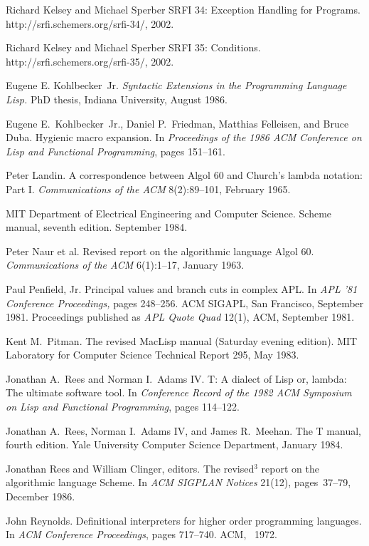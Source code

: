 \begin{thebibliography}{999}
Richard Kelsey and Michael Sperber
SRFI 34: Exception Handling for Programs.
{\cf http://srfi.schemers.org/srfi-34/}, 2002.

Richard Kelsey and Michael Sperber
SRFI 35: Conditions.
{\cf http://srfi.schemers.org/srfi-35/}, 2002.

Eugene E. Kohlbecker~Jr.
{\em Syntactic Extensions in the Programming Language Lisp.}
PhD thesis, Indiana University, August 1986.

Eugene E.~Kohlbecker~Jr., Daniel P.~Friedman, Matthias Felleisen, and Bruce Duba.
Hygienic macro expansion.
In {\em Proceedings of the 1986 ACM Conference on Lisp
  and Functional Programming}, pages 151--161.

Peter Landin.
A correspondence between Algol 60 and Church's lambda notation: Part I.
{\em Communications of the ACM} 8(2):89--101, February 1965.

MIT Department of Electrical Engineering and Computer Science.
Scheme manual, seventh edition.
September 1984.

Peter Naur et al.
Revised report on the algorithmic language Algol 60.
{\em Communications of the ACM} 6(1):1--17, January 1963.

Paul Penfield, Jr.
Principal values and branch cuts in complex APL.
In {\em APL '81 Conference Proceedings,} pages 248--256.
ACM SIGAPL, San Francisco, September 1981.
Proceedings published as {\em APL Quote Quad} 12(1), ACM, September 1981.

Kent M.~Pitman.
The revised MacLisp manual (Saturday evening edition).
MIT Laboratory for Computer Science Technical Report 295, May 1983.

Jonathan A.~Rees and Norman I.~Adams IV.
T: A dialect of Lisp or, lambda: The ultimate software tool.
In {\em Conference Record of the 1982 ACM Symposium on Lisp and
  Functional Programming}, pages 114--122.

Jonathan A.~Rees, Norman I.~Adams IV, and James R.~Meehan.
The T manual, fourth edition.
Yale University Computer Science Department, January 1984.

Jonathan Rees and William Clinger, editors.
The revised$^3$ report on the algorithmic language Scheme.
In {\em ACM SIGPLAN Notices} 21(12), pages~37--79, December 1986.

John Reynolds.
Definitional interpreters for higher order programming languages.
In {\em ACM Conference Proceedings}, pages 717--740.
ACM, ~1972.


\end{thebibliography}
